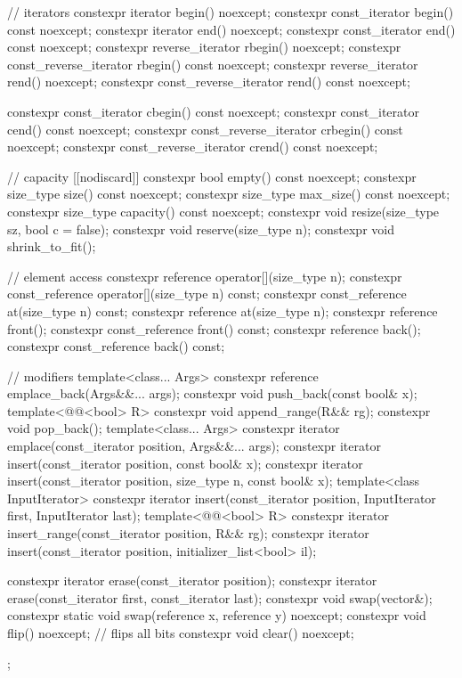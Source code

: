 \begin{codeblock}
{{    // iterators
    constexpr iterator               begin() noexcept;
    constexpr const_iterator         begin() const noexcept;
    constexpr iterator               end() noexcept;
    constexpr const_iterator         end() const noexcept;
    constexpr reverse_iterator       rbegin() noexcept;
    constexpr const_reverse_iterator rbegin() const noexcept;
    constexpr reverse_iterator       rend() noexcept;
    constexpr const_reverse_iterator rend() const noexcept;

    constexpr const_iterator         cbegin() const noexcept;
    constexpr const_iterator         cend() const noexcept;
    constexpr const_reverse_iterator crbegin() const noexcept;
    constexpr const_reverse_iterator crend() const noexcept;

    // capacity
    [[nodiscard]] constexpr bool empty() const noexcept;
    constexpr size_type size() const noexcept;
    constexpr size_type max_size() const noexcept;
    constexpr size_type capacity() const noexcept;
    constexpr void      resize(size_type sz, bool c = false);
    constexpr void      reserve(size_type n);
    constexpr void      shrink_to_fit();

    // element access
    constexpr reference       operator[](size_type n);
    constexpr const_reference operator[](size_type n) const;
    constexpr const_reference at(size_type n) const;
    constexpr reference       at(size_type n);
    constexpr reference       front();
    constexpr const_reference front() const;
    constexpr reference       back();
    constexpr const_reference back() const;

    // modifiers
    template<class... Args> constexpr reference emplace_back(Args&&... args);
    constexpr void push_back(const bool& x);
    template<@@<bool> R>
      constexpr void append_range(R&& rg);
    constexpr void pop_back();
    template<class... Args> constexpr iterator emplace(const_iterator position, Args&&... args);
    constexpr iterator insert(const_iterator position, const bool& x);
    constexpr iterator insert(const_iterator position, size_type n, const bool& x);
    template<class InputIterator>
      constexpr iterator insert(const_iterator position,
                                InputIterator first, InputIterator last);
    template<@@<bool> R>
      constexpr iterator insert_range(const_iterator position, R&& rg);
    constexpr iterator insert(const_iterator position, initializer_list<bool> il);

    constexpr iterator erase(const_iterator position);
    constexpr iterator erase(const_iterator first, const_iterator last);
    constexpr void swap(vector&);
    constexpr static void swap(reference x, reference y) noexcept;
    constexpr void flip() noexcept;     // flips all bits
    constexpr void clear() noexcept;
  };
}
\end{codeblock}%

